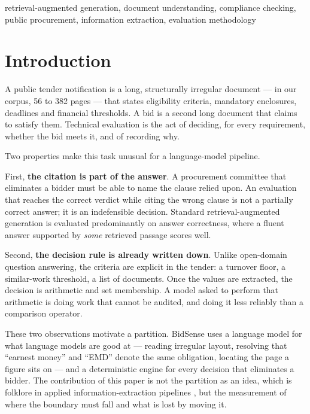 \documentclass[conference]{IEEEtran}
\begin{document}
\begin{IEEEkeywords}
retrieval-augmented generation, document understanding, compliance checking,
public procurement, information extraction, evaluation methodology
\end{IEEEkeywords}

\section{Introduction}

A public tender notification is a long, structurally irregular document --- in
our corpus, 56 to 382 pages --- that states eligibility criteria, mandatory
enclosures, deadlines and financial thresholds. A bid is a second long document
that claims to satisfy them. Technical evaluation is the act of deciding, for
every requirement, whether the bid meets it, and of recording why.

Two properties make this task unusual for a language-model pipeline.

First, \textbf{the citation is part of the answer}. A procurement committee that
eliminates a bidder must be able to name the clause relied upon. An evaluation
that reaches the correct verdict while citing the wrong clause is not a partially
correct answer; it is an indefensible decision. Standard
retrieval-augmented generation \cite{lewis2020rag} is evaluated predominantly on
answer correctness, where a fluent answer supported by \emph{some} retrieved
passage scores well.

Second, \textbf{the decision rule is already written down}. Unlike open-domain
question answering, the criteria are explicit in the tender: a turnover floor, a
similar-work threshold, a list of documents. Once the values are extracted, the
decision is arithmetic and set membership. A model asked to perform that
arithmetic is doing work that cannot be audited, and doing it less reliably than
a comparison operator.

These two observations motivate a partition. BidSense uses a language model for
what language models are good at --- reading irregular layout, resolving that
``earnest money'' and ``EMD'' denote the same obligation, locating the page a
figure sits on --- and a deterministic engine for every decision that eliminates
a bidder. The contribution of this paper is not the partition as an idea, which
is folklore in applied information-extraction pipelines \cite{rashkin2023ais},
but the measurement of where the boundary must fall and what is lost by moving
it.
\end{document}
